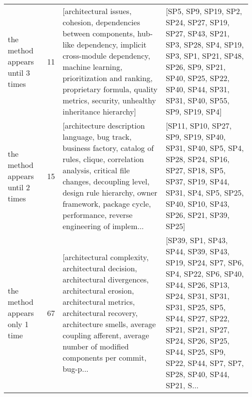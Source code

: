 \begin{tabular}{lrll}
  the method appears until 3 times &     11 &         [architectural issues, cohesion, dependencies between components, hub-like dependency, implicit cross-module dependency, machine learning, prioritization and ranking, proprietary formula, quality metrics, security, unhealthy inheritance hierarchy] &                                                                    [SP5, SP9, SP19, SP2, SP24, SP27, SP19, SP27, SP43, SP21, SP3, SP28, SP4, SP19, SP3, SP1, SP21, SP48, SP26, SP9, SP21, SP40, SP25, SP22, SP40, SP44, SP31, SP31, SP40, SP55, SP9, SP19, SP4] \\
  the method appears until 2 times &     15 &  [architecture description language, bug track, business factory, catalog of rules, clique, correlation analysis, critical file changes, decoupling level, design rule hierarchy, owner framework, package cycle, performance, reverse engineering of implem... &                                                                                  [SP11, SP10, SP27, SP9, SP19, SP40, SP31, SP40, SP5, SP4, SP28, SP24, SP16, SP27, SP18, SP5, SP37, SP19, SP44, SP31, SP4, SP5, SP25, SP40, SP10, SP43, SP26, SP21, SP39, SP25] \\
    the method appears only 1 time &     67 &  [architectural complexity, architectural decision, architectural divergences, architectural erosion, architectural metrics, architectural recovery, architecture smells, average coupling afferent, average number of modified components per commit, bug-p... &  [SP39, SP1, SP43, SP44, SP39, SP43, SP19, SP24, SP7, SP6, SP4, SP22, SP6, SP40, SP44, SP26, SP13, SP24, SP31, SP31, SP31, SP25, SP5, SP44, SP27, SP22, SP21, SP21, SP27, SP24, SP26, SP25, SP44, SP25, SP9, SP22, SP44, SP7, SP7, SP28, SP40, SP44, SP21, S... \\
\bottomrule
\end{tabular}
